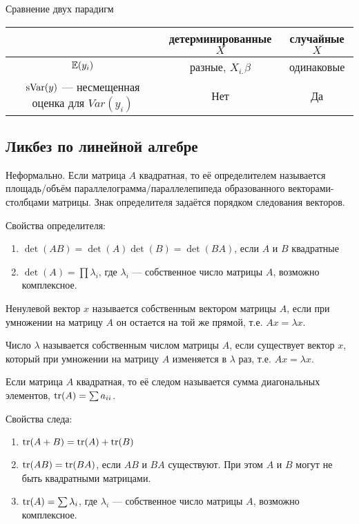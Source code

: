\documentclass[12pt, a4paper]{article}
\theoremstyle{definition}
\begin{document}
Сравнение двух парадигм

\begin{tabular}{c|cc}
\toprule
 & детерминированные $X$  & случайные $X$ \\
\midrule
$\operatorname{\mathbb{E}}(y_i)$ & разные, $X_{i.}\beta$ & одинаковые \\
$\operatorname{sVar}(y)$ — несмещенная оценка для $Var(y_i)$ & Нет & Да \\
\bottomrule
\end{tabular}



\subsection{Ликбез по линейной алгебре}

\begin{definition}
Неформально. Если матрица $A$ квадратная, то её определителем называется площадь/объём параллелограмма/параллелепипеда образованного векторами-столбцами матрицы. Знак определителя задаётся порядком следования векторов.
\end{definition}


Свойства определителя:
\begin{enumerate}
\item $\det(AB)=\det(A)\det(B)=\det(BA)$, если $A$ и $B$ квадратные
\item $\det(A)=\prod \lambda_i$, где $\lambda_i$ — собственное число матрицы $A$, возможно комплексное.
\end{enumerate}


\begin{definition}
Ненулевой вектор $x$ называется собственным вектором матрицы $A$, если при умножении на матрицу $A$ он остается на той же прямой, т.е. $Ax=\lambda x$.
\end{definition}

\begin{definition}
Число $\lambda$ называется собственным числом матрицы $A$, если существует вектор $x$, который при умножении на матрицу $A$ изменяется в $\lambda$ раз, т.е. $Ax=\lambda x$.
\end{definition}

\begin{definition}
Если матрица $A$ квадратная, то её следом называется сумма диагональных элементов, $\trace(A)=\sum a_{ii}$.
\end{definition}

Свойства следа:
\begin{enumerate}
\item $\trace(A+B)=\trace(A)+\trace(B)$
\item $\trace(AB)=\trace(BA)$, если $AB$ и $BA$ существуют. При этом $A$ и $B$ могут не быть квадратными матрицами.
\item $\trace(A)=\sum \lambda_i$, где $\lambda_i$ — собственное число матрицы $A$, возможно комплексное.
\end{enumerate}
\end{document}
